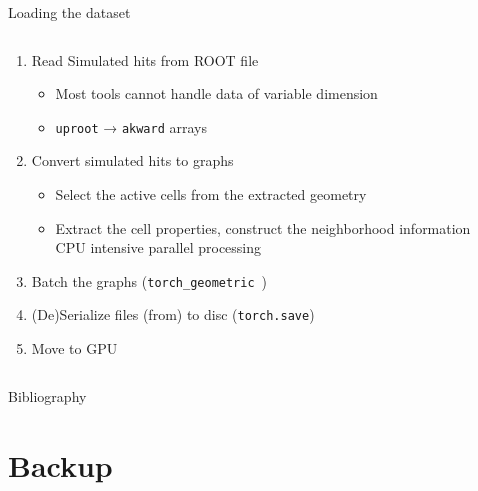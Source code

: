 \documentclass[lualatex,handout,aspectratio=1610]{beamer}
\begin{document}
\begin{frame}{Loading the dataset}
	\label{dataloder}
	\begin{columns}
		\begin{column}{.65\textwidth}
			\begin{enumerate}
				\item Read Simulated hits from ROOT file
				      \begin{itemize}
					      \item Most tools cannot handle data of variable dimension
					      \item \texttt{uproot} → \texttt{akward} arrays
				      \end{itemize}
				\item Convert simulated hits to graphs
				      \begin{itemize}
					      \item Select the active cells from the extracted geometry
					      \item Extract the cell properties, construct the neighborhood information\\
					            CPU intensive \imp parallel processing
				      \end{itemize}
				\item Batch the graphs (\texttt{torch\_geometric}~\cite{torch_geometric.batch})
				\item (De)Serialize files (from) to disc (\texttt{torch.save})
				\item Move to GPU
			\end{enumerate}
		\end{column}
		\begin{column}{.33\textwidth}
		\end{column}
	\end{columns}
\end{frame}


\thankyou

\begin{frame}[allowframebreaks]{Bibliography}
	\printbibliography
\end{frame}


\appendix

\section{Backup}
\end{document}
